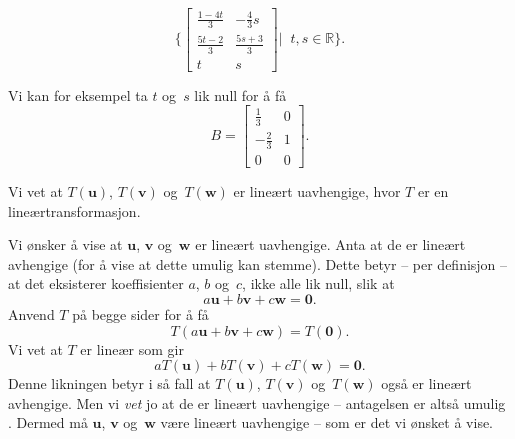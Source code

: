 \documentclass[notitlepage,a4paper,12pt,norsk]{IMFeksamen}
\newcommand{\V}[1]{\mathbf{#1}}
\renewcommand{\u}{\V{u}}
\renewcommand{\v}{\V{v}}
\newcommand{\w}{\V{w}}
\newcommand{\0}{\V{0}}
\newcommand{\oppgslutt}{
\begin{center}
\pgfornament[width=6cm]{88}
\end{center}
}
\newenvironment{losning}{\begin{oppgave}}{\oppgslutt\end{oppgave}}
\begin{document}
\begin{losning}
\[\{\begin{bmatrix}
\frac{1-4t}{3} & -\frac{4}{3}s\\
\frac{5t-2}{3} & \frac{5s+3}{3}\\
t & s
\end{bmatrix}|\;\;t,s\in\mathbb{R}\}.
\]

Vi kan for eksempel ta $t$ og~$s$ lik null for å få
\[
B=
\begin{bmatrix}
\frac{1}{3} & 0\\
-\frac{2}{3} & 1\\
0 & 0
\end{bmatrix}.
\]
\end{losning}


\begin{losning}
Vi vet at $T(\u)$, $T(\v)$ og~$T(\w)$ er lineært uavhengige, hvor $T$ er en lineærtransformasjon. 

Vi ønsker å vise at $\u$, $\v$ og~$\w$ er lineært uavhengige. Anta at de er lineært avhengige (for å vise at dette umulig kan stemme). Dette betyr -- per definisjon -- at det eksisterer koeffisienter $a$, $b$ og~$c$, ikke alle lik null, slik at
\[
a\u+b\v+c\w=\0. 
\]
Anvend $T$ på begge sider for å få 
\[
T(a\u+b\v+c\w)=T(\0). 
\]
Vi vet at $T$ er lineær som gir
\[
aT(\u)+bT(\v)+cT(\w)=\0. 
\]
Denne likningen betyr i så fall at $T(\u)$, $T(\v)$ og~$T(\w)$ også er lineært avhengige. Men vi \emph{vet} jo at de er lineært uavhengige -- antagelsen er altså umulig . Dermed må $\u$, $\v$ og~$\w$ være lineært uavhengige -- som er det vi ønsket å vise.
\end{losning}
\end{document}
